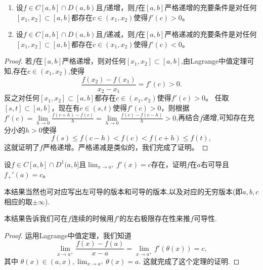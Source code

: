 \documentclass[../../main.tex]{subfiles}
\begin{document}
\begin{theorem}[严格单调和导数的关系]\label{theorem:严格单调和导数的关系}
\begin{enumerate}
\item 设\(f\in C[a,b]\cap D(a,b)\)且\(f\)递增，则\(f\)在\([a,b]\)严格递增的充要条件是对任何\([x_1,x_2]\subset [a,b]\)都存在\(c\in(x_1,x_2)\)使得\(f'(c)>0\)。

\item 设\(f\in C[a,b]\cap D(a,b)\)且\(f\)递减，则\(f\)在\([a,b]\)严格递减的充要条件是对任何\([x_1,x_2]\subset [a,b]\)都存在\(c\in(x_1,x_2)\)使得\(f'(c)<0\)。
\end{enumerate}
\end{theorem}
\begin{proof}
若\(f\)在\([a,b]\)严格递增，则对任何\([x_1,x_2]\subset [a,b]\),由Lagrange中值定理可知,存在\(c\in(x_1,x_2)\),使得
\[
\frac{f(x_2)-f(x_1)}{x_2 - x_1}=f'(c)>0.
\]
反之对任何\([x_1,x_2]\subset [a,b]\)都存在\(c\in(x_1,x_2)\)使得\(f'(c)>0\)。
任取\([s,t]\subset [a,b]\)，现在有\(c\in(s,t)\)使得\(f'(c)>0\)，则根据$f'\left( c \right) =\underset{h\rightarrow 0}{\lim}\frac{f\left( c+h \right) -f\left( c \right)}{h}=\underset{h\rightarrow 0}{\lim}\frac{f\left( c \right) -f\left( c-h \right)}{h}>0$,再结合$f$递增,可知存在充分小的\(h > 0\)使得
\[
f(s)\leqslant f(c - h)<f(c)<f(c + h)\leqslant f(t),
\]
这就证明了\(f\)严格递增。严格递减是类似的，我们完成了证明。

\end{proof}

\begin{theorem}[单侧导数极限定理]\label{theorem:单侧导数极限定理}
设\(f\in C[a,b]\cap D^{1}(a,b]\)且\(\lim_{x\rightarrow a^{+}}f'(x)=c\)存在，证明\(f\)在\(a\)右可导且\(f_{+}'(a)=c\)。
\end{theorem}
\begin{remark}
本结果当然也可对应写出左可导的版本和可导的版本,以及对应的无穷版本(即$a,b,c$相应的取$\pm \infty$).
\end{remark}
\begin{note}
本结果告诉我们可在\(f\)连续的时候用\(f'\)的左右极限存在性来推\(f\)可导性.
\end{note}
\begin{proof}
运用Lagrange中值定理，我们知道
\[\lim_{x\rightarrow a^{+}}\frac{f(x)-f(a)}{x - a}=\lim_{x\rightarrow a^{+}}f'(\theta(x))=c,\]
其中
\(\theta(x)\in(a,x),\lim_{x\rightarrow a^{+}}\theta(x)=a.\)
这就完成了这个定理的证明.

\end{proof}
\end{document}

